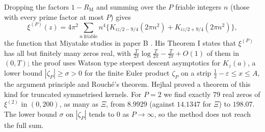 Dropping the factors $1-R_{\mathrm M}$ and summing over the $P$ friable integers $n$ (those with every prime factor at most $P$) gives
\[
\xi^{(P)}(z)=4\pi^2\sum_{n\ \text{friable}}n^4\Big\{K_{iz/2-9/4}(2\pi n^2)+K_{iz/2+9/4}(2\pi n^2)\Big\},
\]
the function that Miyatake studies in paper B \cite{Miyatake51b}. His Theorem I states that $\xi^{(P)}$ has all but finitely many zeros real, with $\frac T{2\pi}\log\frac T{2\pi}-\frac T{2\pi}+O(1)$ of them in $(0,T)$; the proof uses Watson type steepest descent asymptotics for $K_z(a)$, a lower bound $|\zeta_P|\ge\sigma>0$ for the finite Euler product $\zeta_P$ on a strip $\frac12-\varepsilon\le x\le A$, the argument principle and Rouch\'e's theorem.
Hejhal \cite{Hejhal90} proved a theorem of this kind for truncated symmetrised kernels.
For $P=2$ we find exactly $79$ real zeros of $\xi^{(2)}$ in $(0,200)$, as many as $\Xi$, from $8.9929$ (against $14.1347$ for $\Xi$) to $198.07$. The lower bound $\sigma$ on $|\zeta_P|$ tends to $0$ as $P\to\infty$, so the method does not reach the full sum.

